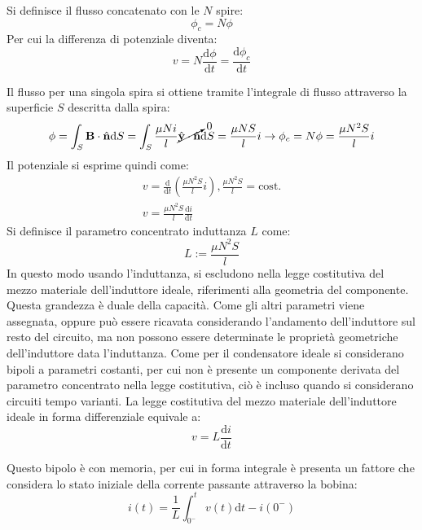 \documentclass{article}
\newcommand{\vect}[1]{\boldsymbol{\mathbf{#1}}}
\newcommand{\df}{\mathrm{d}}
\numberwithin{equation}{subsection}
\begin{document}
Si definisce il flusso concatenato con le $N$ spire:
\begin{equation*}
    \phi_c=N\phi
\end{equation*}
Per cui la differenza di potenziale diventa:
\begin{equation*}
    v=N\displaystyle\frac{\df\phi}{\df t}=\frac{\df\phi_c}{\df t}
\end{equation*}

Il flusso per una singola spira si ottiene tramite l'integrale di flusso attraverso la superficie $S$ descritta dalla spira:
\begin{equation*}
    \phi=\displaystyle\int_S\vect{B}\cdot\hat{\vect{n}}\df S=\int_S\frac{\mu N i}{l}\cancelto{0}{\hat{\vect{y}}\cdot\hat{\vect{n}}}\df S=\frac{\mu N S}{l}i\to \phi_c=N\phi=\frac{\mu N^2S}{l}i
\end{equation*}
Il potenziale si esprime quindi come:
\begin{gather*}
    v=\displaystyle\frac{\df}{\df t}\left(\frac{\mu N^2S}{l}i\right),\frac{\mu N^2S}{l}=\mathrm{cost.}\\
    v=\displaystyle\frac{\mu N^2S}{l}\frac{\df i}{\df t}
\end{gather*}
Si definisce il parametro concentrato induttanza $L$ come:
\begin{equation*}
    L:=\displaystyle\frac{\mu N^2S}{l}
\end{equation*} 
In questo modo usando l'induttanza, si escludono nella legge costitutiva del mezzo materiale dell'induttore ideale, riferimenti alla geometria del componente. Questa grandezza 
è duale della capacità. Come gli altri parametri viene assegnata, oppure può essere ricavata considerando l'andamento dell'induttore sul resto del circuito, ma non possono essere 
determinate le proprietà geometriche dell'induttore data l'induttanza. Come per il condensatore ideale si considerano bipoli a parametri costanti, per cui non è presente 
un componente derivata del parametro concentrato nella legge costitutiva, ciò è incluso quando si considerano circuiti tempo varianti.
La legge costitutiva del mezzo materiale dell'induttore ideale in forma differenziale equivale a:
\begin{equation}
    v=\displaystyle L\frac{\df i}{\df t}
\end{equation}

Questo bipolo è con memoria, per cui in forma integrale è presenta un fattore che considera lo stato iniziale della corrente passante attraverso la bobina:
\begin{equation}
    i(t)=\displaystyle\frac{1}{L}\int_{0^-}^tv(t)\df t-i(0^-)
\end{equation}
\end{document}
